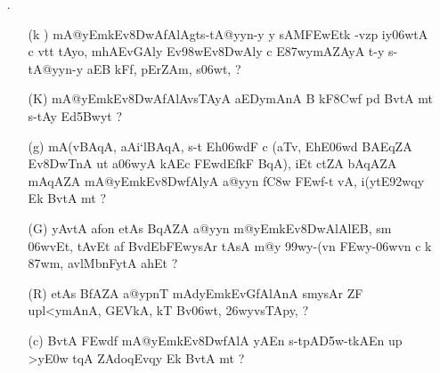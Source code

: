 \begin{itemize}
\begin{itemize}
               \end{itemize}

\item[{\dn \dnnum \rn{13}}.] \begin{itemize}
            
            \item[({\dn k })] {\dn mA@yEmkEv\38DwAfAlAgts\2-tA@yyn-y y sAM\3FEw\-Etk\2 -vzp iy\306wtA c vt\?{\qvb}t\?{\rs ,\re} tAyo, mhAEvGAly\? Ev\398w\-Ev\38DwAly\? c E\387wymAZAyA\2\- t-y s\2-tA@yyn-y aEB kFf, pErZAm, s\2\306wt, {\rs ?\re} }

            \item[({\dn K})] {\dn mA@yEmkEv\38DwAfAlAvsTAyA aEDymAnA B kF\38Cwf\2 pd\2 BvtA\2 mt\? s\2-tAy Ed\35Bwy\?t {\rs ?\re}}
            
            \item[({\dn g})] {\dn mA(vBAqA{\rs ,\re} aAi`lBAqA{\rs ,\re} s\2-t Eh\306wdF c {\rs (\re}aTv{\rs ,\re} EhE\306wd BAEqZA\2 Ev\38DwT\0nA\2 ut\? a\306wyA kAEc \3FEwd\?EfkF BqA{\rs ),\re} iEt ctZA\2 bAqAZA\2 mAqAZA\2 mA@yEmkEv\38DwfAlyA a@yyn\2 f\3C8w\2 \3FEwf-t\2 vA{\rs ,\re} i(y\?tE\392wqy\? Ek\2 BvtA\2 mt {\rs ?\re}}
            
            \item[({\dn G})] {\dn yAvtA\2 a\2fon etAs\2 BqAZA a@yyn\2 m@yEmk\-Ev\38DwAlAlEB, sm\- \306wv\?Et{\rs ,\re} tAvEt a\2f\? BvdEb\3FEwy\-sAr\2 tAsA\2 m@y\? \399w\?y-(v\?n \3FEw\?y-\306wv\?n c k\2 \387wm, avlMbnFytA ah\0Et {\rs ?\re}} 
            
            \item[({\dn R})] {\dn etAs\2 BfAZA a@ypnT{\rdt} mAdyEmkEvGfAlAnA\2 smysAr ZF upl<ymAnA, GEVkA, kT\2 Bv\306wt, \326wyvsTApy\?, {\rs ?\re}}
            
            \item[({\dn c})] {\dn BvtA\2 \3FEwd\?f\? mA@yEmkEv\38DwfAlA yAEn s\2-tpA\3D5w\--tkAEn up\- >y\3E0w\?{\rs ,\re} t\?qA\2 ZAdoqEvqy\? Ek\2 BvtA\2 mt {\rs ?\re}}
            \end{itemize}
\end{itemize}


